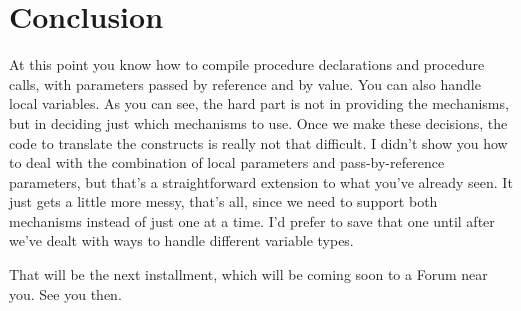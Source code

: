 \section{Conclusion}

At this point you know  how to compile procedure declarations and procedure calls, with  parameters  passed  by  reference  and by value. You can also handle local variables. As you can see, the hard part is not  in  providing  the  mechanisms, but in deciding just which mechanisms to use. Once we make these  decisions, the code to translate the constructs is really not that difficult. I didn't  show  you  how  to  deal  with the combination of local parameters   and  pass-by-reference  parameters, but  that's   a straightforward extension to  what  you've already seen. It just gets a little more messy, that's all, since we  need  to  support both mechanisms instead of just one at a  time. I'd  prefer to save  that  one  until after we've  dealt  with  ways  to  handle different variable types.

That will be the next installment, which will be coming soon to a Forum near you. See you then.
